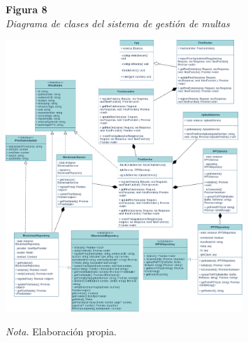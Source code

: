 \begin{figure}[htbp]
    \begin{flushleft}
        \textbf{Figura 8}\\
        \textit{Diagrama de clases del sistema de gestión de multas}
    \end{flushleft}
    \centering
    \includegraphics[width=0.8\textwidth]{Images/uml.png}
    \vspace{0.5em}
    \begin{flushleft}
        \textit{Nota.} Elaboración propia.
    \end{flushleft}
    \label{fig:diagrama_clases}
\end{figure}

